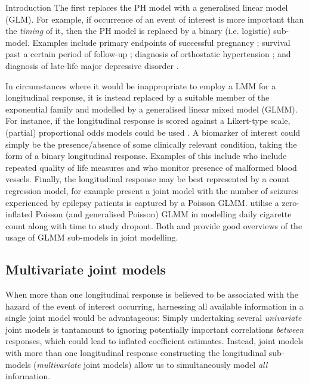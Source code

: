 \begin{chapter}{\label{cha:intro}Introduction}
  The first replaces the PH model with a generalised linear model (GLM). For example, if occurrence of an event of interest is more important than the \textit{timing} of it, then the PH model is replaced by a binary (i.e. logistic) sub-model. Examples include primary endpoints of successful pregnancy \citep{Horrocks2009}; survival past a certain period of follow-up \citep{Bernhardt15}; diagnosis of orthostatic hypertension \citep{Hwang2011, Hwang2015}; and diagnosis of late-life major depressive disorder \citep{li2015flexible}.

  In circumstances where it would be inappropriate to employ a LMM for a longitudinal response, it is instead replaced by a suitable member of the exponential family and modelled by a generalised linear mixed model (GLMM). For instance, if the longitudinal response is scored against a Likert-type scale, (partial) proportional odds models could be used \citep{Li2010, Alam2021}. A biomarker of interest could simply be the presence/absence of some clinically relevant condition, taking the form of a binary longitudinal response. Examples of this include \citet{Choi2015} who include repeated quality of life measures and \citet{Rustand2023} who monitor presence of malformed blood vessels. Finally, the longitudinal response may be best represented by a count regression model, for example \citet{Sunethra2018} present a joint model with the number of seizures experienced by epilepsy patients is captured by a Poisson GLMM. \citet{Zhu2018} utilise a zero-inflated Poisson (and generalised Poisson) GLMM in modelling daily cigarette count along with time to study dropout. Both \citet{Hickey2016} and \citet{Alsefri2020} provide good overviews of the usage of GLMM sub-models in joint modelling.
  
  \subsection{Multivariate joint models}\label{sec:intro-evolution-multivariate}
  When more than one longitudinal response is believed to be associated with the hazard of the event of interest occurring, harnessing all available information in a single joint model would be advantageous: Simply undertaking several \textit{univariate} joint models is tantamount to ignoring potentially important correlations \textit{between} responses, which could lead to inflated coefficient estimates. Instead, joint models with more than one longitudinal response constructing the longitudinal sub-models (\textit{multivariate} joint models) allow us to simultaneously model \textit{all} information.
  

\end{chapter}
